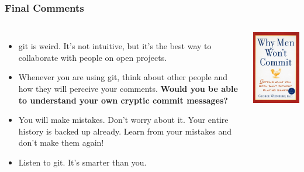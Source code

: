 \documentclass{beamer}
\begin{document}
\begin{frame}
\frametitle{Final Comments}
\begin{columns}
\begin{itemize}
\item git is weird. It's not intuitive, but it's the best way to collaborate with people on open projects.
\item Whenever you are using git, think about other people and how they will perceive your comments. \textbf{Would you be able to understand your own cryptic commit messages?}
\item You will make mistakes. Don't worry about it. Your entire history is backed up already. Learn from your mistakes and don't make them again!
\item Listen to git. It's smarter than you.
\end{itemize}
\includegraphics[width=\textwidth]{commit_book.jpg}
\end{columns}
\end{frame}
\end{document}
